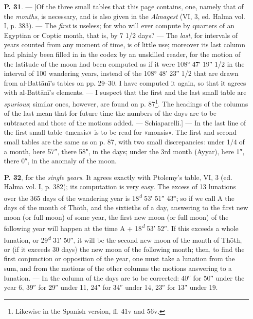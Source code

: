 \documentclass[11pt]{article}
\newcommand{\Pg}[1]{\marginpar{\footnotesize\color{gray}#1}}
\begin{document}
\par \textbf{P. 31}. — [Of the three small tables that this page contains, one, namely that of the \emph{months}, is necessary, and is also given in the \emph{Almagest} (VI, 3, ed. Halma vol. I, p. 383). — The \emph{first} is useless; for who will ever compute by quarters of an Egyptian or Coptic month, that is, by 7 1/2 days? — The \emph{last}, for intervals of years counted from any moment of time, is of little use; moreover its last column had plainly been filled in in the codex by an unskilled reader, for the motion of the latitude of the moon had been computed as if it were 108° 47′ 19″ 1/2 in the interval of 100 wandering years, instead of the 108° 48′ 23″ 1/2 that are drawn from al-Battānī's tables on pp. 29–30. I have computed it again, so that it agrees with al-Battānī's elements. — I suspect that the first and the last small table are \emph{spurious}; similar ones, however, are found on p. 87\footnote{Likewise in the Spanish version, ff. 41v and 56v.}. The headings of the columns of the last mean that for future time the numbers of the days are to be subtracted and those of the motions added. — Schiaparelli.] — In the last line of the first small table «mensis» is to be read for «monsis». The first and second small tables are the same as on p. 87, with two small discrepancies: under 1/4 of a month, here 57″, there 58″, in the days; under the 3rd month (Ayyār), here 1″, there 0″, in the anomaly of the moon.\par
\par \Pg{II 207}\textbf{P. 32}, for the \emph{single years}. It agrees exactly with Ptolemy's table, VI, 3 (ed. Halma vol. I, p. 382); its computation is very easy. The excess of 13 lunations over the 365 days of the wandering year is 18\textsuperscript{\itshape d} 53′ 51″ 43‴; so if we call A the days of the month of Thōth, and the sixtieths of a day, answering to the first new moon (or full moon) of some year, the first new moon (or full moon) of the following year will happen at the time A + 18\textsuperscript{\itshape d} 53′ 52″. If this exceeds a whole lunation, or 29\textsuperscript{\itshape d} 31′ 50″, it will be the second new moon of the month of Thōth, or (if it exceeds 30 days) the new moon of the following month; then, to find the first conjunction or opposition of the year, one must take a lunation from the sum, and from the motions of the other columns the motions answering to a lunation. — In the column of the days are to be corrected: 40″ for 50″ under the year 6, 39″ for 29″ under 11, 24″ for 34″ under 14, 23″ for 13″ under 19.\par
\end{document}
